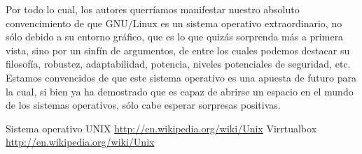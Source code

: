 \documentclass[12pt]{article}
\begin{document}
Por todo lo cual, los autores querríamos manifestar nuestro absoluto convencimiento de que GNU/Linux es un sistema operativo extraordinario, no sólo debido a su entorno gráfico, que es lo que quizás sorprenda más a primera vista, sino por un sinfín de argumentos, de entre los cuales podemos destacar su filosofía, robustez, adaptabilidad, potencia, niveles potenciales de seguridad, etc. Estamos convencidos de que este sistema operativo es una apuesta de futuro para la cual, si bien ya ha demostrado que es capaz de abrirse un espacio en el mundo de los sistemas operativos, sólo cabe esperar sorpresas positivas.

\newpage
\begin{thebibliography}{99}
 Sistema operativo UNIX \url{http://en.wikipedia.org/wiki/Unix}
 Virrtualbox \url{http://en.wikipedia.org/wiki/Unix}
\end{thebibliography}
\end{document}
